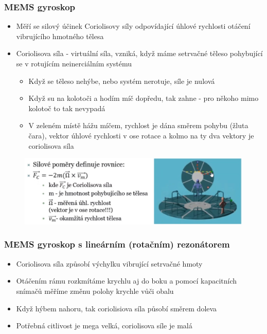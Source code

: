 \subsubsection*{MEMS gyroskop}
\begin{itemize}
    \item Měří se silový účinek Coriolisovy síly odpovídající úhlové rychlosti otáčení vibrujícího hmotného tělesa
    \item Coriolisova síla - virtuální síla, vzniká, když máme setrvačné těleso pohybující se v rotujícím neinerciálním systému \begin{itemize}
        \item Když se těleso nehýbe, nebo systém nerotuje, síle je nulová
        \item Když su na kolotoči a hodím míč dopředu, tak zahne - pro někoho mimo kolotoč to tak nevypadá
        \item V zeleném místě hážu míčem, rychlost je dána směrem pohybu (žluta čara), vektor úhlové rychlosti v ose rotace a kolmo na ty dva vektory je coriolisova síla
    \end{itemize}
\end{itemize}

\begin{figure}[h]
    \centering
    \includegraphics[scale = 0.40]{img/coriolis.png}
\end{figure}

\subsubsection*{MEMS gyroskop s lineárním (rotačním) rezonátorem}
\begin{itemize}
    \item Coriolisova síla způsobí výchylku vibrující setrvačné hmoty
    \item Otáčením rámu rozkmítáme krychlu aj do boku a pomocí kapacitních snímačů měříme změnu polohy krychle vůči obalu
    \item Když hýbem nahoru, tak coriolisiova síla působí směrem doleva
    \item Potřebná citlivost je mega velká, coriolisova síle je malá
\end{itemize}

